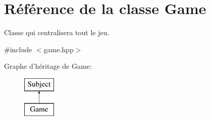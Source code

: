 \hypertarget{classGame}{\section{Référence de la classe Game}
\label{classGame}
}


Classe qui centralisera tout le jeu.  




{\ttfamily \#include $<$game.\+hpp$>$}

Graphe d'héritage de Game\+:\begin{figure}[H]
\begin{center}
\leavevmode
\includegraphics[height=2.000000cm]{classGame}
\end{center}
\end{figure}
